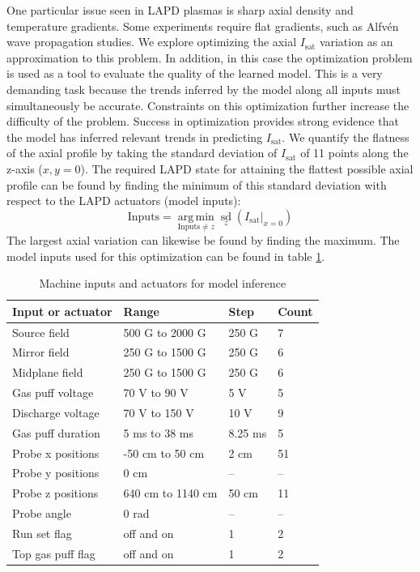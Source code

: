 One particular issue seen in LAPD plasmas is sharp axial density and temperature gradients. Some experiments require flat gradients, such as Alfv\'en wave propagation studies. We explore optimizing the axial $I_\text{sat}$ variation as an approximation to this problem. 
In addition, in this case the optimization problem is used as a tool to evaluate the quality of the learned model. This is a very demanding task because the trends inferred by the model along all inputs must simultaneously be accurate. Constraints on this optimization further increase the difficulty of the problem. Success in optimization provides strong evidence that the model has inferred relevant trends in predicting $I_\text{sat}$.
We quantify the flatness of the axial profile by taking the standard deviation of $I_\text{sat}$ of 11 points along the z-axis ($x,y=0$). The required LAPD state for attaining the flattest possible axial profile can be found by finding the minimum of this standard deviation with respect to the LAPD actuators (model inputs):
\begin{equation}
	\text{Inputs} = \operatorname*{arg\,min}_{\text{Inputs} \neq z} \operatorname*{sd}_{z}(I_\text{sat}|_{x=0})
\end{equation}
The largest axial variation can likewise be found by finding the maximum. The model inputs used for this optimization can be found in table \ref{tab:axial_optimization_inputs}. 

\begin{table}
	\small
	\centering
	\caption{Machine inputs and actuators for model inference}
	\label{tab:axial_optimization_inputs}
	\begin{tabular}{l l l l}
		Input or actuator & Range & Step & Count \\
		\hline
		Source field & 500 G to 2000 G & 250 G & 7 \\
		Mirror field & 250 G to 1500 G & 250 G & 6 \\
		Midplane field & 250 G to 1500 G & 250 G & 6 \\
		Gas puff voltage & 70 V to 90 V & 5 V & 5 \\
		Discharge voltage & 70 V to 150 V & 10 V & 9 \\
		Gas puff duration & 5 ms to 38 ms & 8.25 ms & 5\\
		Probe x positions & -50 cm to 50 cm & 2 cm & 51 \\
		Probe y positions & 0 cm & -- & -- \\
		Probe z positions & 640 cm to 1140 cm & 50 cm & 11 \\
		Probe angle & 0 rad & -- & --\\
		Run set flag & off and on & 1 & 2 \\
		Top gas puff flag & off and on & 1 & 2\\
		
	\end{tabular}
\end{table}

